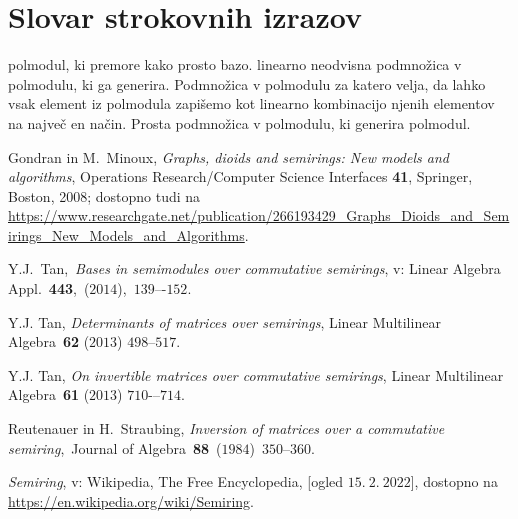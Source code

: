 \documentclass[mat1]{fmfdelo}
\begin{document}
\section*{Slovar strokovnih izrazov}

 polmodul, ki premore kako prosto bazo.
 linearno neodvisna podmnožica v polmodulu, ki ga generira.
 Podmnožica v polmodulu za katero velja, da lahko vsak element iz polmodula zapišemo kot linearno kombinacijo njenih elementov na največ en način. 
 Prosta podmnožica v polmodulu, ki generira polmodul.

\begin{thebibliography}{99}
	
	
	 Gondran in M.~Minoux, \emph{Graphs, dioids and semirings: New models and algorithms}, Operations Research/Computer Science Interfaces \textbf{41}, Springer, Boston, 2008; dostopno tudi na \url{https://www.researchgate.net/publication/266193429_Graphs_Dioids_and_Semirings_New_Models_and_Algorithms}.
	
	
	 Y.J.~Tan,~\emph{Bases in semimodules over commutative semirings}, v: Linear Algebra Appl.~\textbf{443},~($2014$),~$139$–-$152$.
	
	 Y.J. Tan, \emph{Determinants of matrices over semirings}, Linear Multilinear Algebra~\textbf{62} ($2013$) $498$--$517$.
	
	 Y.J. Tan, \emph{On invertible matrices over commutative semirings}, Linear Multilinear Algebra~\textbf{61} ($2013$) $710$-–$714$.
	
	 Reutenauer in H.~Straubing, \emph{Inversion of matrices over a commutative semiring},~Journal of Algebra~\textbf{88}~($1984$)~$350$--$360$.
	
	 \emph{Semiring}, v: Wikipedia, The Free Encyclopedia, [ogled $15.~2.~2022$], dostopno na \url{https://en.wikipedia.org/wiki/Semiring}.
	
\end{thebibliography}
\end{document}
